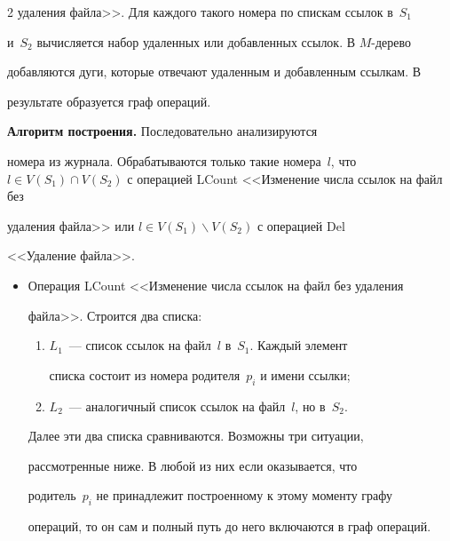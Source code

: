 \begin{multicols}{2}
удаления файла>>. Для каждого такого номера по спискам ссылок в~$S_1$ 


и~$S_2$ вычисляется набор удаленных или добавленных ссылок. В $M$-дерево 


добавляются дуги, которые отвечают удаленным и добавленным ссылкам. В 


результате образуется граф операций. 


      


            \smallskip


            


      \noindent


      \textbf{Алгоритм построения.} Последовательно анализируются 


номера из журнала. Обрабатываются только такие номера~$l$, что $l\in  


V(S_1)\cap V(S_2)$ с операцией LCount <<Изменение числа ссылок на файл без 


удаления файла>> или $l\in V(S_1)\backslash V(S_2)$  с операцией Del 


<<Удаление файла>>. 


\begin{itemize}


\item Операция LCount <<Изменение числа ссылок на файл без удаления 


файла>>. Строится два \mbox{списка:} 


\begin{enumerate}[(1)]


\item $L_1$~--- список ссылок на файл~$l$ в~$S_1$. Каждый элемент 


списка состоит из номера родителя~$p_i$ и имени ссылки;


\item $L_2$~--- аналогичный список ссылок на файл~$l$, но в~$S_2$.


\end{enumerate}


Далее эти два списка сравниваются. Возможны три ситуации, 


рассмотренные ниже. В любой из них если оказывается, что 


родитель~$p_i$ не принадлежит построенному к этому моменту графу 


операций, то он сам и полный путь до него включаются в граф операций.


\begin{enumerate}[1.]



\end{enumerate}
\end{itemize}
\end{multicols}
